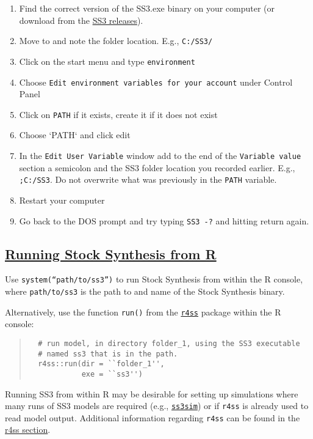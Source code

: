 \begin{enumerate}
  \item Find the correct version of the SS3.exe binary on your computer (or download from the \href{https://github.com/nmfs-ost/ss3-source-code/releases}{SS3 releases}).
  \item Move to and note the folder location. E.g., \texttt{C:/SS3/}
  \item Click on the start menu and type \texttt{environment}
  \item Choose \texttt{Edit environment variables for your account} under Control Panel
  \item Click on \texttt{PATH} if it exists, create it if it does not exist 
  \item Choose `PATH` and click edit
  \item In the \texttt{Edit User Variable} window add to the end of the \texttt{Variable value} section a semicolon and the SS3 folder location you recorded earlier.
     E.g., \texttt{;C:/SS3}. Do not overwrite what was previously in the \texttt{PATH} variable.
  \item Restart your computer
  \item Go back to the DOS prompt and try typing \texttt{SS3 -?} and hitting return again.
\end{enumerate}

\hypertarget{SS3inR}{}
\subsection[Running Stock Synthesis from R]{\protect\hyperlink{SS3inR}{Running Stock Synthesis from R}}
Use \texttt{system(``path/to/ss3'')} to run Stock Synthesis from within the R console, where \texttt{path/to/ss3} is the path to and name of the Stock Synthesis binary.

Alternatively, use the function \texttt{run()} from the \href{https://r4ss.github.io/r4ss/index.html}{\texttt{r4ss}} package within the R console:

\begin{quote}
  \begin{verbatim}
  # run model, in directory folder_1, using the SS3 executable
  # named ss3 that is in the path.
  r4ss::run(dir = ``folder_1'',
            exe = ``ss3'')
  \end{verbatim}
\end{quote}

Running SS3 from within R may be desirable for setting up simulations where many runs of SS3 models are required (e.g., \href{https://github.com/ss3sim/ss3sim}{\texttt{ss3sim}}) or if \texttt{r4ss} is already used to read model output. Additional information regarding \texttt{r4ss} can be found in the \hyperref[sec:r4ss]{r4ss section}. 

